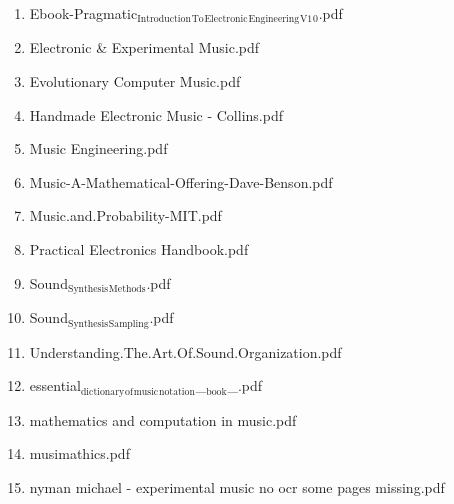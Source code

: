 \documentclass[11pt]{article}
\begin{document}
\begin{enumerate}
\begin{enumerate}
\begin{enumerate}
\begin{enumerate}
\begin{enumerate}
\begin{enumerate}
\begin{enumerate}
\item Ebook-Pragmatic$_{\text{Introduction}}$$_{\text{To}}$$_{\text{Electronic}}$$_{\text{Engineering}}$$_{\text{V1}}$$_{\text{0}}$.pdf
\label{sec-1-1-1-1-7-1-1-134-3-8}

\item Electronic \& Experimental Music.pdf
\label{sec-1-1-1-1-7-1-1-134-3-9}

\item Evolutionary Computer Music.pdf
\label{sec-1-1-1-1-7-1-1-134-3-10}

\item Handmade Electronic Music - Collins.pdf
\label{sec-1-1-1-1-7-1-1-134-3-11}

\item Music Engineering.pdf
\label{sec-1-1-1-1-7-1-1-134-3-12}

\item Music-A-Mathematical-Offering-Dave-Benson.pdf
\label{sec-1-1-1-1-7-1-1-134-3-13}

\item Music.and.Probability-ΜΙΤ.pdf
\label{sec-1-1-1-1-7-1-1-134-3-14}

\item Practical Electronics Handbook.pdf
\label{sec-1-1-1-1-7-1-1-134-3-15}

\item Sound$_{\text{Synthesis}}$$_{\text{Methods}}$.pdf
\label{sec-1-1-1-1-7-1-1-134-3-16}

\item Sound$_{\text{Synthesis}}$$_{\text{Sampling}}$.pdf
\label{sec-1-1-1-1-7-1-1-134-3-17}

\item Understanding.The.Art.Of.Sound.Organization.pdf
\label{sec-1-1-1-1-7-1-1-134-3-18}

\item essential$_{\text{dictionary}}$$_{\text{of}}$$_{\text{music}}$$_{\text{notation}}$\_$_{\text{book}}$\_.pdf
\label{sec-1-1-1-1-7-1-1-134-3-19}

\item mathematics and computation in music.pdf
\label{sec-1-1-1-1-7-1-1-134-3-20}

\item musimathics.pdf
\label{sec-1-1-1-1-7-1-1-134-3-21}

\item nyman michael - experimental music no ocr some pages missing.pdf
\label{sec-1-1-1-1-7-1-1-134-3-22}
\end{enumerate}
\end{enumerate}


\end{enumerate}
\end{enumerate}
\end{enumerate}
\end{enumerate}
\end{enumerate}
\end{document}
